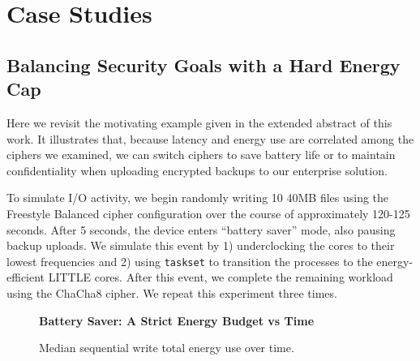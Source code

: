 \section{\sys Case Studies} \label{sec:usecases}


\subsection{Balancing Security Goals with a Hard Energy Cap} \label{subsec:uc1}

Here we revisit the motivating example given in the extended abstract
of this work. It illustrates that, because latency and energy use are
correlated among the ciphers we examined, we can switch ciphers to
save battery life or to maintain confidentiality when uploading
encrypted backups to our enterprise solution. 

To simulate I/O activity, we begin randomly writing 10 40MB files
using the Freestyle Balanced cipher configuration over the course of
approximately 120-125 seconds. After 5 seconds, the device enters
``battery saver'' mode, also pausing backup uploads. We simulate this
event by 1) underclocking the cores to their lowest frequencies and 2)
using \texttt{taskset} to transition the \sys processes to the
energy-efficient LITTLE cores. After this event, we complete the
remaining workload using the ChaCha8 cipher. We repeat this experiment
three times. 

\begin{figure}[ht] \textbf{Battery Saver: A Strict Energy
   Budget vs Time}\par\medskip
   \centering
   {} \caption{Median sequential write total
   energy use over time.}
  \label{fig:usecase-battery}
\end{figure}

